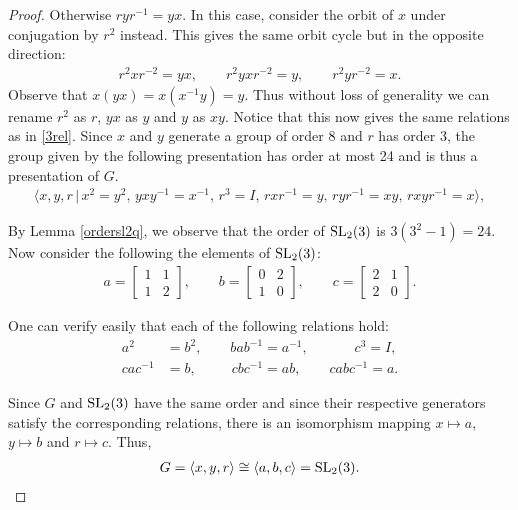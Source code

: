 \begin{proof}
Otherwise $r y r^{-1} = yx$. In this case, consider the orbit of $x$ under conjugation by $r^2$ instead. This gives the same orbit cycle but in the opposite direction:
\begin{align*} r^2 x r^{-2} = yx, \qquad r^2 yx r^{-2} = y, \qquad r^2 y r^{-2} = x.
\end{align*}
Observe that $x(yx) = x (x^{-1} y) = y$. Thus without loss of generality we can rename $r^2$ as $r$, $yx$ as $y$ and $y$ as $xy$. Notice that this now gives the same relations as in \eqref{3rel}. Since $x$ and $y$ generate a group of order 8 and $r$ has order 3, the group given by the following presentation has order at most 24 and is thus a presentation of $G$. 
\begin{align*} \langle x, y, r \, |  \, x^2= y^2, \, y x y^{-1} = x^{-1}, \, r^3 = I, \, r x r^{-1} = y, \, r y r^{-1} = xy, \, r xy r^{-1} = x \rangle,
\end{align*}

By Lemma \ref{ordersl2q}, we observe that the order of $\operatorname{SL}_2(3)$ is $3(3^2-1) = 24$. Now consider the following the elements of $\operatorname{SL}_2(3)$:
\begin{align*} a = \begin{bmatrix} 1 & 1 \\ 1 & 2 \end{bmatrix}, \qquad b = \begin{bmatrix} 0 & 2 \\ 1 & 0 \end{bmatrix}, \qquad c = \begin{bmatrix} 2 & 1 \\ 2 & 0 \end{bmatrix}.
\end{align*}

One can verify easily that each of the following relations hold:
\begin{align*} a^2 &= b^2, \qquad b a b^{-1} = a^{-1}, \qquad \quad \; c^3 = I, 
\\ c a c^{-1} &= b,  \qquad \; \: c b c^{-1} = ab, \qquad \! c ab c^{-1} = a.
\end{align*}

Since $G$ and $\operatorname{SL}_2(3)$ have the same order and since their respective generators satisfy the corresponding relations, there is an isomorphism mapping $x \mapsto a$, $y \mapsto b$ and $r \mapsto c$. Thus,
\begin{align*} G = \langle x, y, r \rangle \cong \langle a, b, c \rangle = \operatorname{SL}_2(3). 
\end{align*} 
\end{proof}
